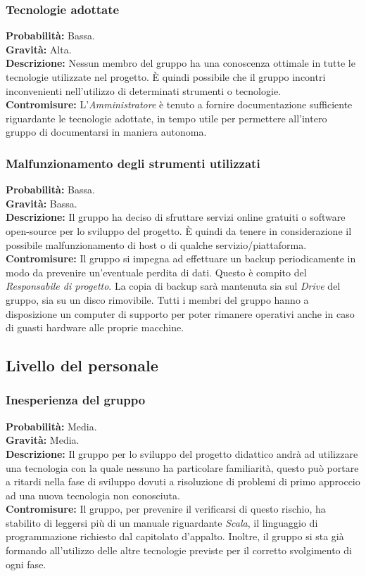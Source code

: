 \documentclass[a4paper]{article}
\begin{document}
			\subsubsection{Tecnologie adottate}
				\textbf{Probabilità:} Bassa.
				\\ 
				\textbf{Gravità:} Alta.
				\\ 
				\textbf{Descrizione:} Nessun membro del gruppo ha una conoscenza ottimale in tutte le tecnologie utilizzate nel 
					progetto. È quindi possibile che il gruppo incontri inconvenienti nell'utilizzo 
					di determinati strumenti o tecnologie.
				\\ 
				\textbf{Contromisure:} L'\emph{Amministratore} è tenuto a fornire documentazione sufficiente riguardante 
					le tecnologie adottate, in tempo utile per permettere all'intero gruppo di documentarsi 
					in maniera autonoma.
			\subsubsection{Malfunzionamento degli strumenti utilizzati}
			\label{MalfunzionamentoStrumenti}
				\textbf{Probabilità:} Bassa.
				\\ 
				\textbf{Gravità:} Bassa.
				\\ 
				\textbf{Descrizione:} Il gruppo ha deciso di sfruttare servizi online gratuiti o software open-source per lo 
					sviluppo del progetto. È quindi da tenere in considerazione il possibile malfunzionamento 
					di host o di qualche servizio/piattaforma.
				\\ 
				\textbf{Contromisure:} Il gruppo si impegna ad effettuare un backup periodicamente in modo da prevenire un'eventuale 
					perdita di dati. Questo è compito del \emph{Responsabile di progetto}. La copia di backup sarà mantenuta 
					sia sul \emph{Drive} del gruppo, sia su un disco rimovibile. Tutti i membri del gruppo hanno a disposizione 
					un computer di supporto per poter rimanere operativi anche in caso di guasti hardware alle proprie macchine.
		\subsection{Livello del personale}
			\subsubsection{Inesperienza del gruppo}
				\textbf{Probabilità:} Media.
				\\ 
				\textbf{Gravità:} Media.
				\\ 
				\textbf{Descrizione:} Il gruppo per lo sviluppo del progetto didattico andrà ad utilizzare una tecnologia 
					con la quale nessuno ha particolare familiarità, questo può portare a ritardi 
					nella fase di sviluppo dovuti a risoluzione di problemi di primo approccio ad una 
					nuova tecnologia non conosciuta.
				\\ 
				\textbf{Contromisure:} Il gruppo, per prevenire il verificarsi di questo rischio, ha stabilito di leggersi
					più di un manuale riguardante \emph{Scala}, il linguaggio di programmazione richiesto
					dal capitolato d'appalto. Inoltre, il gruppo si sta già formando all'utilizzo delle
					altre tecnologie previste per il corretto svolgimento di ogni fase.
\end{document}
